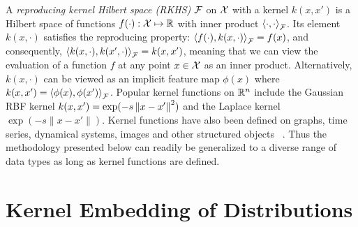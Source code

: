 \documentclass{article}
\begin{document}
A \emph{reproducing kernel Hilbert space (RKHS)} $\mathcal{F}$ on $\mathcal{X}$ with a kernel $k(x,x')$ is a Hilbert space of
functions $f(\cdot):\mathcal{X} \mapsto \mathbb{R}$ with inner product $\left\langle \cdot,\cdot \right\rangle_{\mathcal{F}}$. Its element $k(x,\cdot)$ satisfies the reproducing property:
$\left\langle f(\cdot),k(x, \cdot) \right\rangle_{\mathcal{F}} = f(x)$, and consequently, $\left\langle k(x,\cdot),k(x', \cdot) \right\rangle_{\mathcal{F}} = k(x,x')$,
meaning that we can view the evaluation of a function $f$ at any point $x\in\mathcal{X}$ as an inner product. Alternatively, $k(x,\cdot)$ can  be viewed as an implicit feature map $\phi(x)$ where $k(x,x')=\left\langle \phi(x),\phi(x') \right\rangle_{\mathcal{F}}$.
Popular kernel functions on $\mathbb{R}^n$ include the Gaussian RBF kernel $k(x,x') = \exp(-s
  \left\|x-x'\right\|^2)$ and the Laplace kernel $\exp(-s \|x - x'\|)$. Kernel functions have also been defined on
graphs, time series, dynamical systems, images and other structured
objects \, \cite{SchTsuVer04}. Thus the methodology presented below can readily be generalized to a diverse range of data types as long as kernel functions are defined.

%



\section{Kernel Embedding of Distributions}
\label{sec:embedding}
\end{document}

